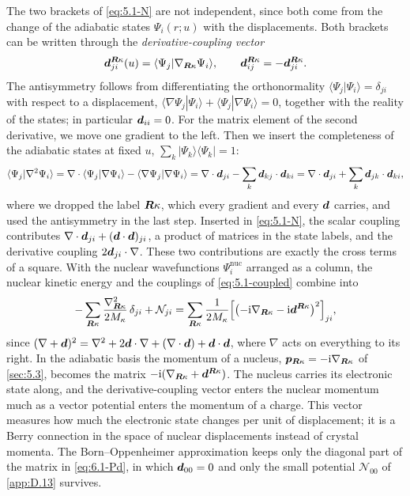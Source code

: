 The two brackets of \cref{eq:5.1-N} are not independent, since both come from the change of the adiabatic states $\Psi_i(r;u)$ with the displacements. Both brackets can be written through the \emph{derivative-coupling vector}
\begin{equation}
  \bm{d}^{\bm{R}\kappa}_{ji}(u) = \langle\Psi_j|\nabla_{\bm{R}\kappa}\Psi_i\rangle ,
  \qquad \bm{d}^{\bm{R}\kappa}_{ij} = -\bm{d}^{\bm{R}\kappa}_{ji} .
  \label{eq:6.1-d}
\end{equation}
The antisymmetry follows from differentiating the orthonormality $\langle\Psi_j|\Psi_i\rangle = \delta_{ji}$ with respect to a displacement, $\langle\nabla\Psi_j|\Psi_i\rangle + \langle\Psi_j|\nabla\Psi_i\rangle = 0$, together with the reality of the states; in particular $\bm{d}_{ii} = 0$. For the matrix element of the second derivative, we move one gradient to the left. Then we insert the completeness of the adiabatic states at fixed $u$, $\sum_k|\Psi_k\rangle\langle\Psi_k| = 1$:
\begin{equation*}
  \langle\Psi_j|\nabla^2\Psi_i\rangle = \nabla\cdot\langle\Psi_j|\nabla\Psi_i\rangle - \langle\nabla\Psi_j|\nabla\Psi_i\rangle
  = \nabla\cdot\bm{d}_{ji} - \sum_k\bm{d}_{kj}\cdot\bm{d}_{ki}
  = \nabla\cdot\bm{d}_{ji} + \sum_k\bm{d}_{jk}\cdot\bm{d}_{ki} ,
\end{equation*}
where we dropped the label $\bm{R}\kappa$, which every gradient and every $\bm{d}$ carries, and used the antisymmetry in the last step. Inserted in \cref{eq:5.1-N}, the scalar coupling contributes $\nabla\cdot\bm{d}_{ji} + (\bm{d}\cdot\bm{d})_{ji}$, a product of matrices in the state labels, and the derivative coupling $2\bm{d}_{ji}\cdot\nabla$. These two contributions are exactly the cross terms of a square. With the nuclear wavefunctions $\Psi^{\mathrm{nuc}}_i$ arranged as a column, the nuclear kinetic energy and the couplings of \cref{eq:5.1-coupled} combine into
\begin{equation}
  -\sum_{\bm{R}\kappa}\frac{\nabla_{\bm{R}\kappa}^2}{2M_\kappa}\,\delta_{ji} + \mathcal{N}_{ji}
  = \sum_{\bm{R}\kappa}\frac{1}{2M_\kappa}\Bigl[\bigl(-\mathrm{i}\nabla_{\bm{R}\kappa} - \mathrm{i}\bm{d}^{\bm{R}\kappa}\bigr)^2\Bigr]_{ji} ,
  \label{eq:6.1-Pd}
\end{equation}
since $(\nabla + \bm{d})^2 = \nabla^2 + 2\bm{d}\cdot\nabla + (\nabla\cdot\bm{d}) + \bm{d}\cdot\bm{d}$, where $\nabla$ acts on everything to its right. In the adiabatic basis the momentum of a nucleus, $\bm{p}_{\bm{R}\kappa} = -\mathrm{i}\nabla_{\bm{R}\kappa}$ of \cref{sec:5.3}, becomes the matrix $-\mathrm{i}(\nabla_{\bm{R}\kappa} + \bm{d}^{\bm{R}\kappa})$. The nucleus carries its electronic state along, and the derivative-coupling vector enters the nuclear momentum much as a vector potential enters the momentum of a charge. This vector measures how much the electronic state changes per unit of displacement; it is a Berry connection in the space of nuclear displacements instead of crystal momenta. The Born--Oppenheimer approximation keeps only the diagonal part of the matrix in \cref{eq:6.1-Pd}, in which $\bm{d}_{00} = 0$ and only the small potential $\mathcal{N}_{00}$ of \cref{app:D.13} survives.

